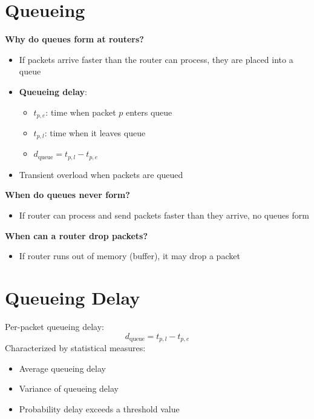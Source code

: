 \documentclass[9pt]{extarticle}
\begin{document}
\begin{multicols*}{3}
{\color{sectioncolor}\section*{\centering Queueing}}
\textbf{Why do queues form at routers?}
\begin{itemize}
    \item If packets arrive faster than the router can process, they are placed into a queue
    \item \textbf{Queueing delay}:
    \begin{itemize}
        \item \( t_{p,e} \): time when packet \( p \) enters queue
        \item \( t_{p,l} \): time when it leaves queue
        \item \( d_{\text{queue}} = t_{p,l} - t_{p,e} \)
    \end{itemize}
    \item Transient overload when packets are queued
\end{itemize}

\textbf{When do queues never form?}
\begin{itemize}
    \item If router can process and send packets faster than they arrive, no queues form
\end{itemize}

\textbf{When can a router drop packets?}
\begin{itemize}
    \item If router runs out of memory (buffer), it may drop a packet
\end{itemize}

{\color{sectioncolor}\section*{\centering Queueing Delay}}
Per-packet queueing delay:
\[
d_{\text{queue}} = t_{p,l} - t_{p,e}
\]
Characterized by statistical measures:
\begin{itemize}
    \item Average queueing delay
    \item Variance of queueing delay
    \item Probability delay exceeds a threshold value
\end{itemize}


\end{multicols*}
\end{document}
